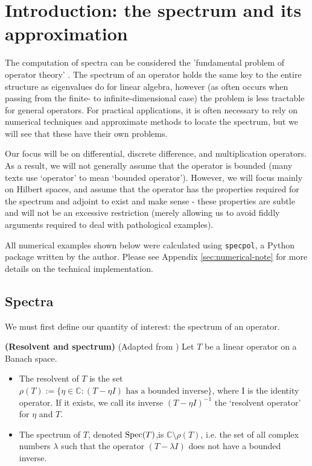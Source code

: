 \documentclass[../main.tex]{subfiles}
\begin{document}
\section{Introduction: the spectrum and its approximation}

The computation of spectra can be considered the 'fundamental problem of
operator theory' \parencite{arveson2002short}. The spectrum of an operator holds
the same key to the entire structure as eigenvalues do for linear algebra,
however (as often occurs when passing from the finite- to infinite-dimensional
case) the problem is less tractable for general operators. For practical
applications, it is often necessary to rely on numerical techniques and
approximate methods to locate the spectrum, but we will see that these have
their own problems.

Our focus will be on differential, discrete difference, and multiplication
operators. As a result, we will not generally assume that the operator is
bounded (many texts use `operator' to mean `bounded operator'). However, we will
focus mainly on Hilbert spaces, and assume that the operator has the properties
required for the spectrum and adjoint to exist and make sense - these properties
are subtle and will not be an excessive restriction (merely allowing us to avoid
fiddly arguments required to deal with pathological examples).

All numerical examples shown below were calculated using \texttt{specpol}, a
Python package written by the author. Please see Appendix
\ref{sec:numerical-note} for more details on the technical implementation.
\subsection{Spectra}

We must first define our quantity of interest: the spectrum of an operator.
\begin{definition}{\textbf{(Resolvent and spectrum)}}
  (Adapted from \parencite{edmunds2018spectral})
  Let $T$ be a linear operator on a Banach space.
  \begin{itemize}
  \item The resolvent of $T$ is the set 
    $\rho(T) := \{\eta \in \mathbb{C} : (T - \eta I)\text{ has a bounded inverse}\}$,
    where I is the identity
    operator. If it exists, we call its inverse $(T - \eta I)^{-1}$
    the `resolvent operator' for $\eta$ and $T$.
  \item The spectrum of $T$, denoted $\mathrm{Spec}(T)$,is
    $\mathbb{C} \setminus \rho(T)$, i.e. the set of all complex numbers $\lambda$
    such that the operator $(T - \lambda I)$ does not have a bounded inverse.
  \end{itemize}
\end{definition}
\end{document}
